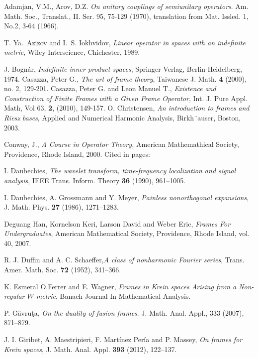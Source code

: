 \begin{titlepage}
\begin{thebibliography}{99}
 Adamjan, V.M., Arov, D.Z. \textit{On unitary couplings of semiunitary operators}. Am. Math. Soc., Translat., II. Ser. 95,
75-129 (1970), translation from Mat. Issled. 1, No.2, 3-64 (1966).


 T. Ya.~Azizov and I.~S. Iokhvidov, \textit{Linear operator in spaces with an indefinite metric}, Wiley-Interscience, Chichester, 1989.

J. Bogn\'ar, \textit{Indefinite inner product spaces}, Springer Verlag, Berlin-Heidelberg, 1974.
  Casazza, Peter G., \textit{The art of frame theory}, Taiwanese J. Math. \textbf{4} (2000), no. 2, 129-201.
 Casazza, Peter G. and Leon Manuel T., \textit{Existence and Construction of Finite Frames with a Given Frame Operator},  Int. J. Pure Appl. Math, Vol 63, \textbf{ 2}, (2010), 149-157.
 O. Christensen, \textit{An introduction to frames and Riesz bases}, Applied and Numerical Harmonic
Analysis, Birkh¨auser, Boston, 2003.

 Conway, J., \textit{A Course in Operator Theory, }American Mathemathical Society, Providence, Rhode Island, 2000. Cited in pages:

I. Daubechies, \textit{The wavelet transform, time-frequency localization and signal analysis}, IEEE Trans. Inform. Theory \textbf{36} (1990), 961--1005.

 I. Daubechies, A. Grossmann and Y. Meyer, \textit{Painless nonorthogonal expansions}, J. Math. Phys. \textbf{27} (1986), 1271--1283.



Deguang Han, Kornelson Keri, Larson David and Weber Eric, \textit{Frames For Undergraduates}, American Mathematical Society, Providence, Rhode Island, vol. 40, 2007.


 R. J. Duffin and A. C. Schaeffer,\textit{A class of nonharmonic Fourier series}, Trans. Amer. Math. Soc. \textbf{72} (1952), 341--366.

 K. Esmeral O.Ferrer and E. Wagner, \textit{Frames in Krein spaces Arising from a Non-regular $W$-metric}, Banach Journal In Mathematical Analysis.

 P.  G\u{a}vru\c{t}a, \textit{On the duality of fusion frames}. J. Math. Anal. Appl., 333 (2007), 871--879.

  J. I. Giribet, A. Maestripieri, F. Mart\'inez Per\'ia and P. Massey, \textit{On frames for Krein spaces}, J. Math. Anal. Appl. \textbf{393} (2012), 122--137.


\end{thebibliography}
\end{titlepage}
